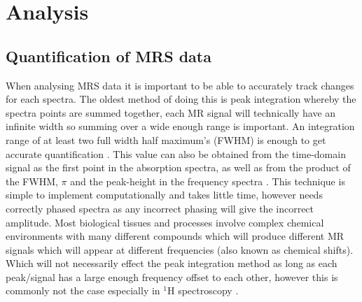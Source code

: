 \documentclass[class=article, crop=false]{standalone}
\begin{document}
\section{Analysis}

\subsection{Quantification of MRS data}

When analysing MRS data it is important to be able to accurately track changes for each spectra. The oldest method of doing this is peak integration whereby the spectra points are summed together, each MR signal will technically have an infinite width so summing over a wide enough range is important. An integration range of at least two full width half maximum's (FWHM) is enough to get accurate quantification \cite{Near2021PreprocessingRecommendations}. This value can also be obtained from the time-domain signal as the first point in the absorption spectra, as well as from the product of the FWHM, $\pi$ and the peak-height in the frequency spectra \cite{deGraaf2019InSpectroscopy}. This technique is simple to implement computationally and takes little time, however needs correctly phased spectra as any incorrect phasing will give the incorrect amplitude. Most biological tissues and processes involve complex chemical environments with many different compounds which will produce different MR signals which will appear at different frequencies (also known as chemical shifts). Which will not necessarily effect the peak integration method as long as each peak/signal has a large enough frequency offset to each other, however this is commonly not the case especially in $^1$H spectroscopy \cite{Alger2010QuantitativeReview}. 
\end{document}

